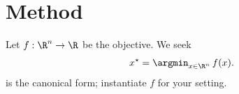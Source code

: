 \section{Method}
\label{sec:method}

Let $f : \R^n \to \R$ be the objective. We seek
%
\begin{equation}
  \label{eq:argmin}
  x^\star = \argmin_{x \in \R^n}\, f(x).
\end{equation}
%
 is the canonical form; instantiate $f$ for your setting.
